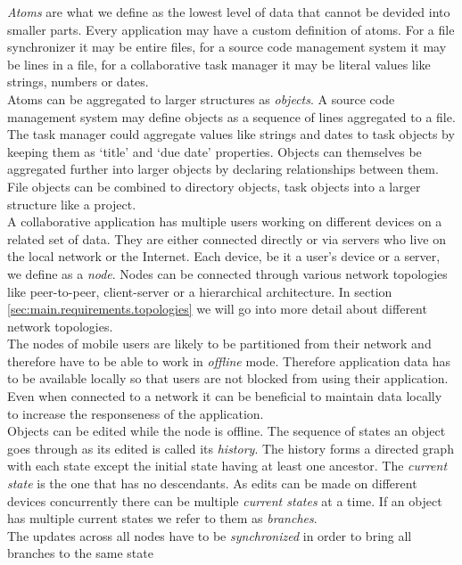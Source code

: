 \emph{Atoms} are what we define as the lowest level of data that cannot be devided into smaller parts.
Every application may have a custom definition of atoms.
For a file synchronizer it may be entire files, for a source code management system it may be lines in a file, for a collaborative task manager it may be literal values like strings, numbers or dates.\\
Atoms can be aggregated to larger structures as \emph{objects}.
A source code management system may define objects as a sequence of lines aggregated to a file.
The task manager could aggregate values like strings and dates to task objects by keeping them as `title' and `due date' properties.
Objects can themselves be aggregated further into larger objects by declaring relationships between them.
File objects can be combined to directory objects, task objects into a larger structure like a project.\\
A collaborative application has multiple users working on different devices on a related set of data.
They are either connected directly or via servers who live on the local network or the Internet.
Each device, be it a user's device or a server, we define as a \emph{node}.
Nodes can be connected through various network topologies like peer-to-peer, client-server or a hierarchical architecture.
In section \ref{sec:main.requirements.topologies} we will go into more detail about different network topologies.\\
The nodes of mobile users are likely to be partitioned from their network and therefore have to be able to work in \emph{offline} mode.
Therefore application data has to be available locally so that users are not blocked from using their application.
Even when connected to a network it can be beneficial to maintain data locally to increase the responseness of the application.\\
Objects can be edited while the node is offline.
The sequence of states an object goes through as its edited is called its \emph{history}.
The history forms a directed graph with each state except the initial state having at least one ancestor.
The \emph{current state} is the one that has no descendants.
As edits can be made on different devices concurrently there can be multiple \emph{current states} at a time.
If an object has multiple current states we refer to them as \emph{branches}.\\
The updates across all nodes have to be \emph{synchronized} in order to bring all branches to the same state\\
